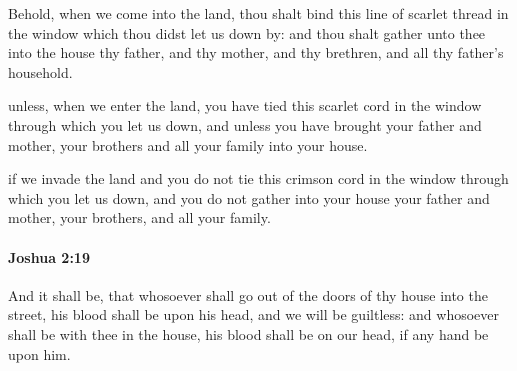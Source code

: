 			\begin{versebox}
					\item[BHS] 
					\item[ASV] Behold, when we come into the land, thou shalt bind this line of scarlet thread in the window which thou didst let us down by: and thou shalt gather unto thee into the house thy father, and thy mother, and thy brethren, and all thy father's household.
					\item[NIV] unless, when we enter the land, you have tied this scarlet cord in the window through which you let us down, and unless you have brought your father and mother, your brothers and all your family into your house.
					\item[NRSV] if we invade the land and you do not tie this crimson cord in the window through which you let us down, and you do not gather into your house your father and mother, your brothers, and all your family.
			\end{versebox}

		\paragraph{Joshua 2:19} %
			\label{JOSHUA-2-19}

			And it shall be, that whosoever shall go out of the doors of thy house into the street, his blood shall be upon his head, and we will be guiltless: and whosoever shall be with thee in the house, his blood shall be on our head, if any hand be upon him.

